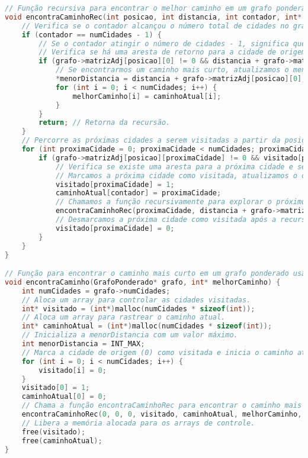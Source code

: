 \documentclass[12pt]{spieman}
\begin{document}
\begin{lstlisting}[language=C]
// Função recursiva para encontrar o melhor caminho em um grafo ponderado.
void encontraCaminhoRec(int posicao, int distancia, int contador, int* visitado, int* caminhoAtual, int* melhorCaminho, int numCidades, GrafoPonderado* grafo, int* menorDistancia) {
    // Verifica se o contador alcançou o número total de cidades no grafo.
    if (contador == numCidades - 1) {
        // Se o contador atingir o número de cidades - 1, significa que visitamos todas as cidades.
        // Verifica se há uma aresta de retorno para a cidade de origem (ciclo completo) e se a distância total é menor.
        if (grafo->matrizAdj[posicao][0] != 0 && distancia + grafo->matrizAdj[posicao][0] < *menorDistancia) {
            // Se encontrarmos um caminho mais curto, atualizamos o menorDistancia e o melhorCaminho.
            *menorDistancia = distancia + grafo->matrizAdj[posicao][0];
            for (int i = 0; i < numCidades; i++) {
                melhorCaminho[i] = caminhoAtual[i];
            }
        }
        return; // Retorna da recursão.
    }
    // Percorre as próximas cidades a serem visitadas a partir da posição atual.
    for (int proximaCidade = 0; proximaCidade < numCidades; proximaCidade++) {
        if (grafo->matrizAdj[posicao][proximaCidade] != 0 && visitado[proximaCidade] == 0) {
            // Verifica se existe uma aresta para a próxima cidade e se essa cidade ainda não foi visitada.
            // Marcamos a próxima cidade como visitada, atualizamos o caminho atual e a distância.
            visitado[proximaCidade] = 1;
            caminhoAtual[contador] = proximaCidade;
            // Chamamos a função recursivamente para explorar o próximo nível de cidades.
            encontraCaminhoRec(proximaCidade, distancia + grafo->matrizAdj[posicao][proximaCidade], contador + 1, visitado, caminhoAtual, melhorCaminho, numCidades, grafo, menorDistancia);
            // Desmarcamos a próxima cidade como visitada após a recursão para explorar outros caminhos.
            visitado[proximaCidade] = 0;
        }
    }
}

// Função para encontrar o caminho mais curto em um grafo ponderado usando força bruta.
void encontraCaminho(GrafoPonderado* grafo, int* melhorCaminho) {
    int numCidades = grafo->numCidades;
    // Aloca um array para controlar as cidades visitadas.
    int* visitado = (int*)malloc(numCidades * sizeof(int));
    // Aloca um array para rastrear o caminho atual.
    int* caminhoAtual = (int*)malloc(numCidades * sizeof(int));
    // Inicializa a menorDistancia com um valor máximo.
    int menorDistancia = INT_MAX;
    // Marca a cidade de origem (0) como visitada e inicia o caminho atual.
    for (int i = 0; i < numCidades; i++) {
        visitado[i] = 0;
    }
    visitado[0] = 1;
    caminhoAtual[0] = 0;
    // Chama a função encontraCaminhoRec para encontrar o caminho mais curto.
    encontraCaminhoRec(0, 0, 0, visitado, caminhoAtual, melhorCaminho, numCidades, grafo, &menorDistancia);
    // Libera a memória alocada para os arrays de controle.
    free(visitado);
    free(caminhoAtual);
}


\end{lstlisting}
\end{document}
